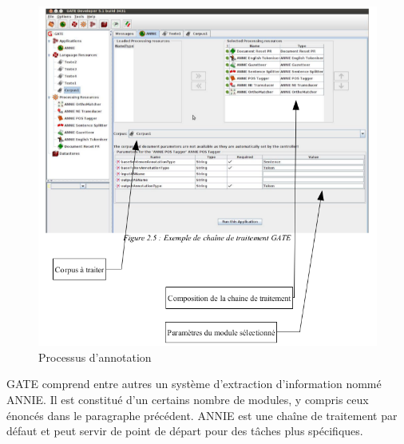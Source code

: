 \documentclass[a4paper, 11pt]{report}
\begin{document}
\begin{figure}[H]
\begin{center}
\includegraphics[scale=0.3]{img/exempleChaineTraitement.png}
\end{center}
\caption{Processus d'annotation}
\end{figure}
GATE comprend entre autres un système d'extraction d'information nommé ANNIE. Il est constitué d'un certains nombre de modules, y compris ceux énoncés dans le paragraphe précédent. ANNIE est une chaîne de traitement par défaut et peut servir de point de départ pour des tâches plus spécifiques.
\end{document}
